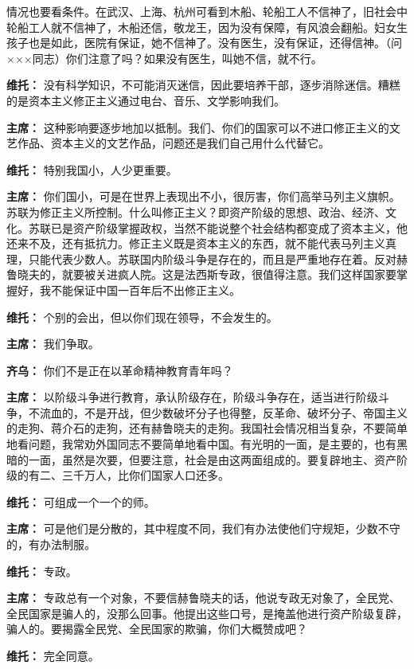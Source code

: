 \begin{duihua}
{情况也要看条件。在武汉、上海、杭州可看到木船、轮船工人不信神了，旧社会中轮船工人就不信神了，木船还信，敬龙王，因为没有保障，有风浪会翻船。妇女生孩子也是如此，医院有保证，她不信神了。没有医生，没有保证，还得信神。（问×××同志）你们注意了吗？如果没有医生，叫她不信，就不行。}
\item[\textbf{维托：}]{没有科学知识，不可能消灭迷信，因此要培养干部，逐步消除迷信。糟糕的是资本主义修正主义通过电台、音乐、文学影响我们。}
\item[\textbf{主席：}]{这种影响要逐步地加以抵制。我们、你们的国家可以不进口修正主义的文艺作品、资本主义的文艺作品，问题还是我们自己用什么代替它。}
\item[\textbf{维托：}] 特别我国小，人少更重要。
\item[\textbf{主席：}] 你们国小，可是在世界上表现出不小，很厉害，你们高举马列主义旗帜。苏联为修正主义所控制。什么叫修正主义？即资产阶级的思想、政治、经济、文化。苏联已是资产阶级掌握政权，当然不能说整个社会结构都变成了资本主义，他还来不及，还有抵抗力。修正主义既是资本主义的东西，就不能代表马列主义真理，只能代表少数人。苏联国内阶级斗争是存在的，而且是严重地存在着。反对赫鲁晓夫的，就要被关进疯人院。这是法西斯专政，很值得注意。我们这样国家要掌握好，我不能保证中国一百年后不出修正主义。
\item[\textbf{维托：}] 个别的会出，但以你们现在领导，不会发生的。
\item[\textbf{主席：}] 我们争取。
\item[\textbf{齐乌：}] 你们不是正在以革命精神教育青年吗？
\item[\textbf{主席：}] 以阶级斗争进行教育，承认阶级存在，阶级斗争存在，适当进行阶级斗争，不流血的，不是开战，但少数破坏分子也得整，反革命、破坏分子、帝国主义的走狗、蒋介石的走狗，还有赫鲁晓夫的走狗。我国社会情况相当复杂，不要简单地看问题，我常劝外国同志不要简单地看中国。有光明的一面，是主要的，也有黑暗的一面，虽然是次要，但要注意，社会是由这两面组成的。要复辟地主、资产阶级的有二、三千万人，比你们国家人口还多。
\item[\textbf{维托：}] 可组成一个一个的师。
\item[\textbf{主席：}] 可是他们是分散的，其中程度不同，我们有办法使他们守规矩，少数不守的，有办法制服。
\item[\textbf{维托：}] 专政。
\item[\textbf{主席：}] 专政总有一个对象，不要信赫鲁晓夫的话，他说专政无对象了，全民党、全民国家是骗人的，没那么回事。他提出这些口号，是掩盖他进行资产阶级复辟，骗人的。要揭露全民党、全民国家的欺骗，你们大概赞成吧？
\item[\textbf{维托：}] 完全同意。

\end{duihua}
